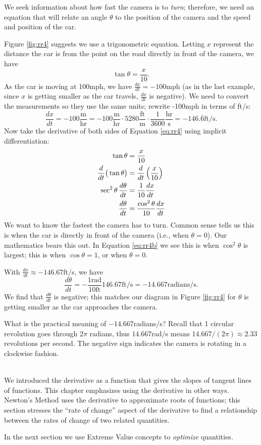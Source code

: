 {We seek information about how fast the camera is to \textit{turn}; therefore, we need an equation that will relate an angle $\theta$ to the position of the camera and the speed and position of the car.

Figure \ref{fig:rr4} suggests we use a trigonometric equation. Letting $x$ represent the distance the car is from the point on the road directly in front of the camera, we have \begin{equation}\tan \theta = \frac{x}{10}.\label{eq:rr4}\end{equation} As the car is moving at 100mph, we have $\frac{dx}{dt} = -100$mph (as in the last example, since $x$ is getting smaller as the car travels, $\frac{dx}{dt}$ is negative). We need to convert the measurements so they use the same units; rewrite -100mph in terms of ft/s:
\[
\frac{dx}{dt} = -100\frac{\text{m}}{\text{hr}} = -100\frac{\text{m}}{\text{hr}}\cdot5280\frac{\text{ft}}{\text{m}}\cdot\frac{1}{3600}\frac{\text{hr}}{\text{s}} =-146.\overline{6}\text{ft/s}.
\]
Now take the derivative of both sides of Equation \eqref{eq:rr4} using implicit differentiation:
\begin{align}
		\tan \theta &= \frac{x}{10} \notag \\
		\frac{d}{dt}\big(\tan \theta\big) &= \frac{d}{dt}\left(\frac{x}{10}\right)\notag \\
		\sec^2\theta\,\frac{d\theta}{dt} &= \frac{1}{10}\frac{dx}{dt}\notag\\
		\frac{d\theta}{dt} &= \frac{\cos^2\theta}{10}\frac{dx}{dt}\label{eq:rr4b}
\end{align}
We want to know the fastest the camera has to turn. Common sense tells us this is when the car is directly in front of the camera (i.e., when $\theta = 0$). Our mathematics bears this out. In Equation \eqref{eq:rr4b} we see this is when $\cos^2\theta$ is largest; this is when $\cos \theta = 1$, or when $\theta = 0$.

With $\frac{dx}{dt} \approx -146.67$ft/s, we have 
	\[
	\frac{d\theta}{dt} = -\frac{1\text{rad}}{10\text{ft}}146.67\text{ft/s} = -14.667\text{radians/s}.
	\]
We find that $\frac{d\theta}{dt}$ is negative; this matches our diagram in Figure \ref{fig:rr4} for $\theta$ is getting smaller as the car approaches the camera.	
	
What is the practical meaning of $-14.667$radians/s? Recall that 1 circular revolution goes through $2\pi$ radians, thus $14.667$rad/s means $14.667/(2\pi)\approx 2.33$ revolutions per second. The negative sign indicates the camera is rotating in a clockwise fashion.
}\\

We introduced the derivative as a function that gives the slopes of tangent lines of functions. This chapter emphasizes using the derivative in other ways. Newton's Method uses the derivative to approximate roots of functions; this section stresses the ``rate of change'' aspect of the derivative to find a relationship between the rates of change of two related quantities. 

In the next section we use Extreme Value concepts to \textit{optimize} quantities. 


